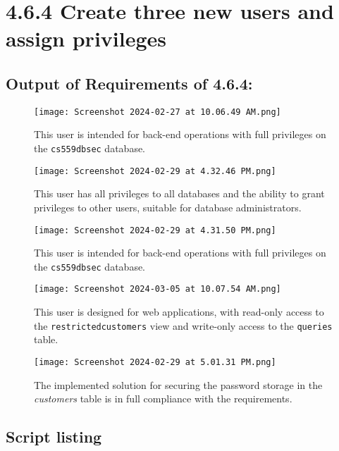\documentclass{article}
\begin{document}
\section*{4.6.4 Create three new users and assign privileges}

\subsection*{Output of Requirements of 4.6.4:}
\begin{figure}[H]
    \centering
    \texttt{[image: Screenshot 2024-02-27 at 10.06.49 AM.png]}
    \caption{This user is intended for back-end operations with full privileges on the \texttt{cs559dbsec} database.}
\end{figure}

\begin{figure}[H]
    \centering
    \texttt{[image: Screenshot 2024-02-29 at 4.32.46 PM.png]}
    \caption{This user has all privileges to all databases and the ability to grant privileges to other users, suitable for database administrators.}
\end{figure}

\begin{figure}[H]
    \centering
    \texttt{[image: Screenshot 2024-02-29 at 4.31.50 PM.png]}
    \caption{This user is intended for back-end operations with full privileges on the \texttt{cs559dbsec} database.}
\end{figure}

\begin{figure}[H]
    \centering
    \texttt{[image: Screenshot 2024-03-05 at 10.07.54 AM.png]}
    \caption{This user is designed for web applications, with read-only access to the \texttt{restrictedcustomers} view and write-only access to the \texttt{queries} table.}
\end{figure}

\begin{figure}[H]
    \centering
    \texttt{[image: Screenshot 2024-02-29 at 5.01.31 PM.png]}
    \caption{The implemented solution for securing the password storage in the \textit{customers} table is in full compliance with the requirements.}
\end{figure}

\subsection*{Script listing}


\end{document}
